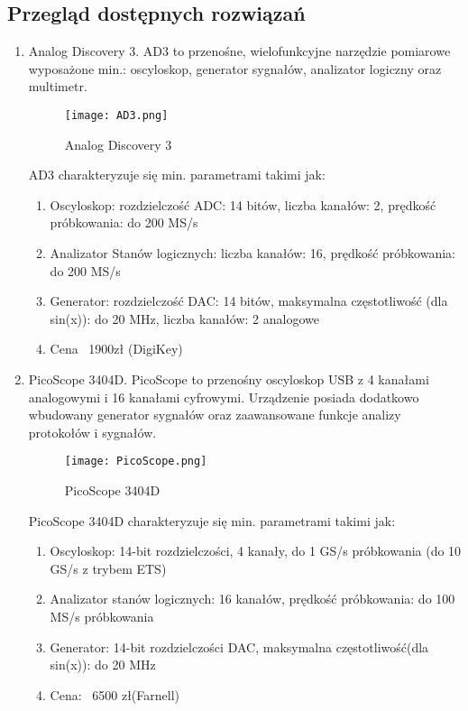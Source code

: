 \subsection{Przegląd dostępnych rozwiązań}
    \begin{enumerate}
        \item Analog Discovery 3.
        \newline AD3 to przenośne, wielofunkcyjne narzędzie pomiarowe wyposażone min.:
        oscyloskop, generator sygnałów, analizator logiczny oraz multimetr.
        \begin{figure}[!ht]
        \centering
        \texttt{[image: AD3.png]}
        \caption{Analog Discovery 3}
        \label{fig:AD3}
    \end{figure}

    AD3 charakteryzuje się min. parametrami takimi jak:
    \begin{enumerate}[label=\arabic*.]
        \item Oscyloskop: rozdzielczość ADC: 14 bitów, liczba kanałów: 2, prędkość próbkowania: do 200 MS/s
        \item Analizator Stanów logicznych: liczba kanałów: 16, prędkość próbkowania: do 200 MS/s
        \item Generator: rozdzielczość DAC: 14 bitów, maksymalna częstotliwość (dla sin(x)): do 20 MHz, 
        liczba kanałów: 2 analogowe
        \item Cena ~1900zł (DigiKey)
    \end{enumerate}

    \item PicoScope 3404D. 
    \newline PicoScope to przenośny oscyloskop USB z 4 kanałami analogowymi i
    16 kanałami cyfrowymi. Urządzenie posiada dodatkowo wbudowany generator
    sygnałów oraz zaawansowane funkcje analizy protokołów i sygnałów.
        \begin{figure}[!ht]
        \centering
        \texttt{[image: PicoScope.png]}
        \caption{PicoScope 3404D}
        \label{fig:PicoScope}
    \end{figure}

    PicoScope 3404D charakteryzuje się min. parametrami takimi jak:
    \begin{enumerate}[label=\arabic*.]
        \item Oscyloskop: 14-bit rozdzielczości, 4 kanały, do 1 GS/s próbkowania (do 10 GS/s z trybem ETS)
        \item Analizator stanów logicznych: 16 kanałów, prędkość próbkowania: do 100 MS/s próbkowania
        \item Generator: 14-bit rozdzielczości DAC, maksymalna częstotliwość(dla sin(x)): do 20 MHz 
        \item Cena: ~6500 zł(Farnell)
    \end{enumerate}

    \end{enumerate}



